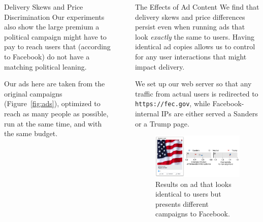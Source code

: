\documentclass[final,hyperref={pdfpagelabels=false}]{beamer}
\newcommand{\shrink}{-15pt}
\begin{document}
\begin{frame}[t]
\begin{columns}[t]
\begin{column}{.45\textwidth}
\begin{block}{\Large Delivery Skews and Price Discrimination}
        Our experiments also show the large premium a political campaign might have to pay to reach users that (according to Facebook) do not have a matching political leaning.\vspace{1em}

        Our ads here are taken from the original campaigns (Figure~\ref{fig:ads}), optimized to reach as many people as possible, run at the same time, and with the same budget.
      \end{block}
    \end{column} %


    \begin{column}{.02\textwidth}\end{column} %

    \begin{column}{.45\textwidth} %
      \vspace{\shrink}
      \begin{block}{\Large The Effects of Ad Content}
        We find that delivery skews and price differences persist even when running ads that look {\it exactly} the same to users. Having identical ad copies allows us to control for any user interactions that might impact delivery.\vspace{1em}

        We set up our web server so that any traffic from actual users is redirected to \texttt{https://fec.gov}, while Facebook-internal IPs are either served a Sanders or a Trump page.\vspace{.5em}

        \begin{figure}
          \includegraphics[scale=1.25]{figures/result-2.png}
          \caption{\hspace{.01em} Results on ad that looks identical to users but presents different campaigns to Facebook.}
        \end{figure}


\end{block}
\end{column}
\end{columns}
\end{frame}
\end{document}
